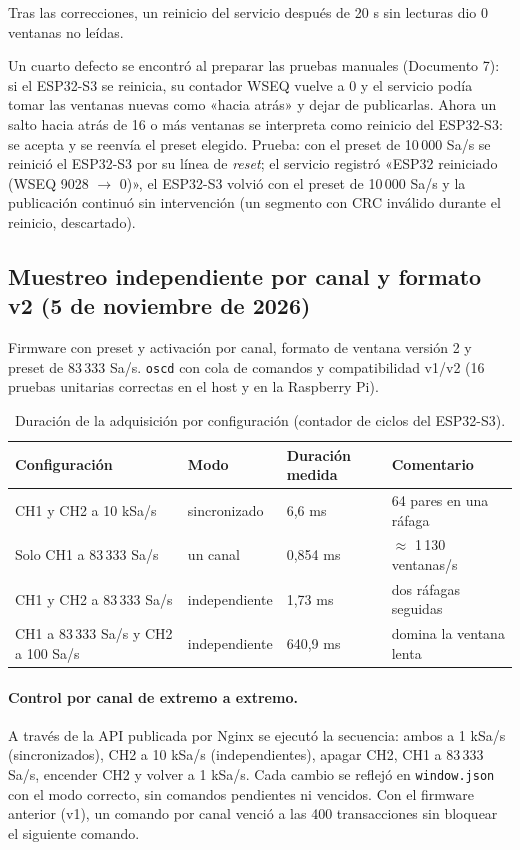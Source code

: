 \documentclass[12pt,a4paper]{article}
\begin{document}
Tras las correcciones, un reinicio del servicio después de 20 s sin lecturas dio 0 ventanas no leídas.

Un cuarto defecto se encontró al preparar las pruebas manuales (Documento 7): si el ESP32-S3 se reinicia, su contador WSEQ vuelve a 0 y el servicio podía tomar las ventanas nuevas como «hacia atrás» y dejar de publicarlas. Ahora un salto hacia atrás de 16 o más ventanas se interpreta como reinicio del ESP32-S3: se acepta y se reenvía el preset elegido. Prueba: con el preset de 10\,000 Sa/s se reinició el ESP32-S3 por su línea de \emph{reset}; el servicio registró «ESP32 reiniciado (WSEQ 9028 $\rightarrow$ 0)», el ESP32-S3 volvió con el preset de 10\,000 Sa/s y la publicación continuó sin intervención (un segmento con CRC inválido durante el reinicio, descartado).

\subsection{Muestreo independiente por canal y formato v2 (5 de noviembre de 2026)}

Firmware con preset y activación por canal, formato de ventana versión 2 y preset de 83\,333 Sa/s. \texttt{oscd} con cola de comandos y compatibilidad v1/v2 (16 pruebas unitarias correctas en el host y en la Raspberry Pi).

\begin{table}[H]
\centering
\small
\begin{tabular}{@{}p{5.6cm} p{2.6cm} p{2.6cm} p{3.8cm}@{}}
\toprule
\textbf{Configuración} & \textbf{Modo} & \textbf{Duración medida} & \textbf{Comentario} \\
\midrule
CH1 y CH2 a 10 kSa/s & sincronizado & 6{,}6 ms & 64 pares en una ráfaga \\
Solo CH1 a 83\,333 Sa/s & un canal & 0{,}854 ms & $\approx$ 1\,130 ventanas/s \\
CH1 y CH2 a 83\,333 Sa/s & independiente & 1{,}73 ms & dos ráfagas seguidas \\
CH1 a 83\,333 Sa/s y CH2 a 100 Sa/s & independiente & 640{,}9 ms & domina la ventana lenta \\
\bottomrule
\end{tabular}
\caption{Duración de la adquisición por configuración (contador de ciclos del ESP32-S3).}
\end{table}

\paragraph{Control por canal de extremo a extremo.} A través de la API publicada por Nginx se ejecutó la secuencia: ambos a 1 kSa/s (sincronizados), CH2 a 10 kSa/s (independientes), apagar CH2, CH1 a 83\,333 Sa/s, encender CH2 y volver a 1 kSa/s. Cada cambio se reflejó en \texttt{window.json} con el modo correcto, sin comandos pendientes ni vencidos. Con el firmware anterior (v1), un comando por canal venció a las 400 transacciones sin bloquear el siguiente comando.
\end{document}
